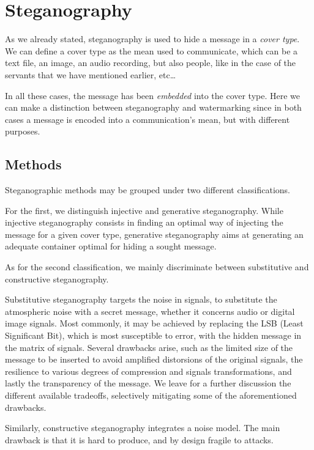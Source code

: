 \documentclass[../../main.tex]{subfiles}
\begin{document}
\section{Steganography}

As we already stated, steganography is used to hide a message in a
\emph{cover type}. We can define a cover type as the mean used to communicate,
which can be a text file, an image, an audio recording, but also people, like in
the case of the servants that we have mentioned earlier, etc\dots

In all these cases, the message has been \emph{embedded} into the cover type.
Here we can make a distinction between steganography and watermarking since in
both cases a message is encoded into a communication's mean, but with different
purposes.

\subsection{Methods}

Steganographic methods may be grouped under two different classifications.

For the first, we distinguish injective and generative steganography.
While injective steganography consists in finding an optimal way of injecting
the message for a given cover type, generative steganography aims at generating
an adequate container optimal for hiding a sought message.

As for the second classification, we mainly discriminate between substitutive
and constructive steganography.

Substitutive steganography targets the noise in signals, to substitute the
atmospheric noise with a secret message, whether it concerns audio or digital
image signals.
Most commonly, it may be achieved by replacing the LSB (Least Significant Bit),
which is most susceptible to error, with the hidden message in the matrix of
signals.
Several drawbacks arise, such as the limited size of the message to be inserted
to avoid amplified distorsions of the original signals, the resilience to
various degrees of compression and signals transformations, and lastly the
transparency of the message.
We leave for a further discussion the different available tradeoffs, selectively
mitigating some of the aforementioned drawbacks. 

Similarly, constructive steganography integrates a noise model.
The main drawback is that it is hard to produce, and by design fragile to
attacks.
\end{document}
